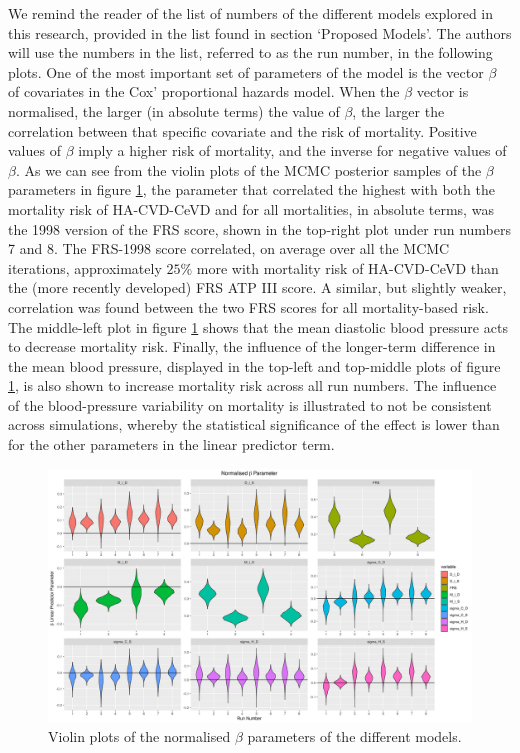 \documentclass[
]{article}
\begin{document}
We remind the reader of the list of numbers of the different models explored in this research, provided in the list found in section `Proposed Models'. The authors will use the numbers in the list, referred to as the run number, in the following plots. One of the most important set of parameters of the model is the vector \(\beta\) of covariates in the Cox' proportional hazards model. When the \(\beta\) vector is normalised, the larger (in absolute terms) the value of \(\beta\), the larger the correlation between that specific covariate and the risk of mortality. Positive values of \(\beta\) imply a higher risk of mortality, and the inverse for negative values of \(\beta\). As we can see from the violin plots of the MCMC posterior samples of the \(\beta\) parameters in figure \ref{fig:betas}, the parameter that correlated the highest with both the mortality risk of HA-CVD-CeVD and for all mortalities, in absolute terms, was the 1998 version of the FRS score, shown in the top-right plot under run numbers 7 and 8. The FRS-1998 score correlated, on average over all the MCMC iterations, approximately \(25\%\) more with mortality risk of HA-CVD-CeVD than the (more recently developed) FRS ATP III score. A similar, but slightly weaker, correlation was found between the two FRS scores for all mortality-based risk. The middle-left plot in figure \ref{fig:betas} shows that the mean diastolic blood pressure acts to decrease mortality risk. Finally, the influence of the longer-term difference in the mean blood pressure, displayed in the top-left and top-middle plots of figure \ref{fig:betas}, is also shown to increase mortality risk across all run numbers. The influence of the blood-pressure variability on mortality is illustrated to not be consistent across simulations, whereby the statistical significance of the effect is lower than for the other parameters in the linear predictor term.

\begin{figure}
\hypertarget{fig:betas}{%
\centering
\includegraphics{./Plots/beta/Beta_parameter_normalised.png}
\caption{Violin plots of the normalised \(\beta\) parameters of the different models.}\label{fig:betas}
}
\end{figure}
\end{document}

